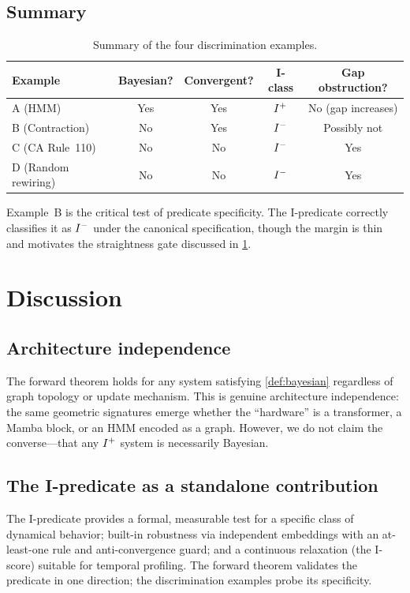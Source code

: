 \documentclass{../shared/primo}
\begin{document}
\subsection{Summary}

\begin{table}[ht]
\centering
\begin{tabular}{lcccc}
\toprule
Example & Bayesian? & Convergent? & I-class & Gap obstruction? \\
\midrule
A (HMM) & Yes & Yes & $I\textsuperscript{+}$ & No (gap increases) \\
B (Contraction) & No & Yes & $I\textsuperscript{$-$}$ & Possibly not \\
C (CA Rule~110) & No & No & $I\textsuperscript{$-$}$ & Yes \\
D (Random rewiring) & No & No & $I\textsuperscript{$-$}$ & Yes \\
\bottomrule
\end{tabular}
\caption{Summary of the four discrimination examples.}
\label{tab:examples}
\end{table}

Example~B is the critical test of predicate specificity. The I-predicate correctly classifies it as $I\textsuperscript{$-$}$ under the canonical specification, though the margin is thin and motivates the straightness gate discussed in \cref{sec:discussion}.


\section{Discussion}
\label{sec:discussion}

\subsection{Architecture independence}

The forward theorem holds for any system satisfying \cref{def:bayesian} regardless of graph topology or update mechanism. This is genuine architecture independence: the same geometric signatures emerge whether the ``hardware'' is a transformer, a Mamba block, or an HMM encoded as a graph. However, we do not claim the converse---that any $I\textsuperscript{+}$ system is necessarily Bayesian.

\subsection{The I-predicate as a standalone contribution}

The I-predicate provides a formal, measurable test for a specific class of dynamical behavior; built-in robustness via independent embeddings with an at-least-one rule and anti-convergence guard; and a continuous relaxation (the I-score) suitable for temporal profiling. The forward theorem validates the predicate in one direction; the discrimination examples probe its specificity.
\end{document}
